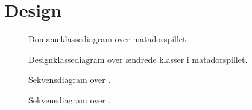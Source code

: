 \chapter{Design}\label{chap:Design}

\begin{figure}
\caption{Domæneklassediagram over matadorspillet.}\label{fig:DomainDia}
\centering

\end{figure}


\begin{figure}
\caption{Designklassediagram over ændrede klasser i matadorspillet.}\label{fig:DesignKlasseChanged}
\centering

\end{figure}


\begin{figure}
\caption{Sekvensdiagram over .}
\label{fig:SekvensOptToBuy}
\centering

\end{figure}


\begin{figure}
\caption{Sekvensdiagram over .}
\label{fig:SekvensLandOnField}
\centering

\end{figure}